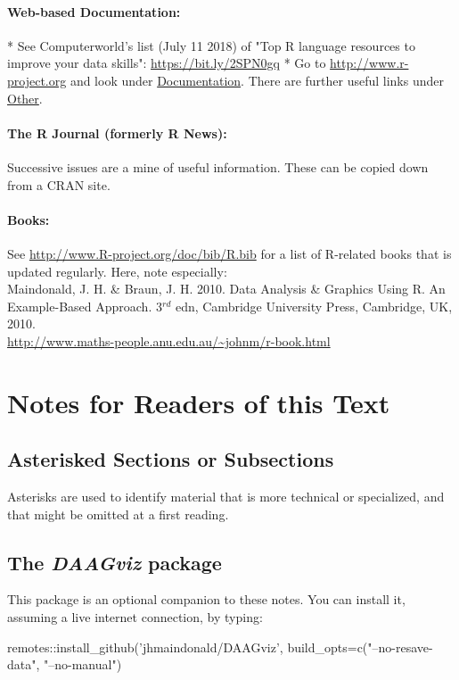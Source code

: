\paragraph{Web-based Documentation:}

* See Computerworld's list (July 11 2018) of "Top R language
resources to improve your data skills":  
\url{https://bit.ly/2SPN0gq}
* Go to \url{http://www.r-project.org}
and look under \underline{Documentation}.
There are further useful links under \underline{Other}.

\paragraph{The R Journal (formerly R News):}
Successive issues are a mine of useful information.
These can be copied down from a CRAN site.

\paragraph{Books:}
See \url{http://www.R-project.org/doc/bib/R.bib} for a list of
R-related books that is updated regularly. Here, note
especially:\\[3pt]
\noindent
Maindonald, J. H. \& Braun, J. H. 2010. Data Analysis \&
  Graphics Using R. An Example-Based Approach. 3$^{rd}$ edn, Cambridge
  University Press,
  Cambridge, UK, 2010.\\
\noindent
\url{http://www.maths-people.anu.edu.au/~johnm/r-book.html}

\cleardoublepage
\section*{Notes for Readers of this Text}

\subsection*{Asterisked Sections or Subsections}

Asterisks are used to identify material that is more technical or
specialized, and that might be omitted at a first reading.

\subsection*{The {\em DAAGviz} package}
This package is an optional companion to these notes. 
You can install it, assuming a live internet connection,
by typing:
\begin{Schunk}
\begin{Sinput}
remotes::install_github('jhmaindonald/DAAGviz',
                        build_opts=c("--no-resave-data", 
                                     "--no-manual")
\end{Sinput}
\end{Schunk}

